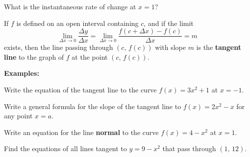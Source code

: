 \documentclass[addpoints, 12pt]{exam}
\begin{document}
What is the instantaneous rate of change at $x=1$?

\newpage


\begin{tcolorbox}[title= DEFINITION OF TANGENT LINE WITH SLOPE \textit{m},colframe=black,sharp corners,colback=white,colbacktitle=white,coltitle=black,boxrule=1pt]

    If $f$ is defined on an open interval containing $c$, and if the limit
    \[\lim_{\Delta x\to0}\frac{\Delta y}{\Delta x}=\lim_{\Delta x\to0}\frac{f(c+\Delta x)-f(c)}{\Delta x}=m\]
    exists, then the line passing through $(c,\,f(c))$ with slope $m$ is the \textbf{tangent line} to the graph of $f$ at the point $(c,\,f(c))$.
    
\end{tcolorbox}
\vspace{.15cm}
\noindent\textbf{Examples:}
\begin{questions}
    \question Write the equation of the tangent line to the curve $f(x)=3x^2+1$ at $x=-1$. 
    
    \question Write a general formula for the slope of the tangent line to $f(x)=2x^2-x$ for any point $x=a$.
    
    \question Write an equation for the line \textbf{normal} to the curve $f(x)=4-x^2$ at $x=1$.
    
    \question Find the equations of all lines tangent to $y=9-x^2$ that pass through $(1,\,12)$.
\end{questions}


\newpage
{}
\end{document}
